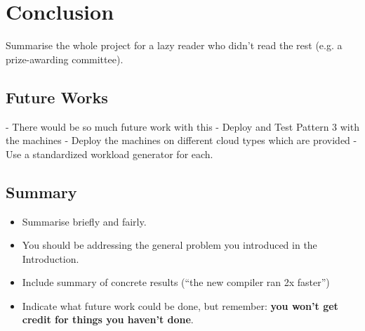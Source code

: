 \chapter{Conclusion}    
Summarise the whole project for a lazy reader who didn't read the rest (e.g. a prize-awarding committee).
\section{Future Works}

- There would be so much future work with this 
- Deploy and Test Pattern 3 with the machines
- Deploy the machines on different cloud types which are provided 
- Use a standardized workload generator for each. 


\section{Summary}
\begin{itemize}
    \item
        Summarise briefly and fairly.
    \item
        You should be addressing the general problem you introduced in the
        Introduction.        
    \item
        Include summary of concrete results (``the new compiler ran 2x
        faster'')
    \item
        Indicate what future work could be done, but remember: \textbf{you
        won't get credit for things you haven't done}.
\end{itemize}
